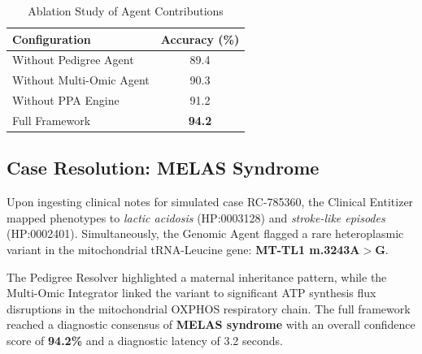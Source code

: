 \documentclass[conference]{IEEEtran}
\begin{document}
\begin{table}[!t]
\caption{Representative multi-omic variant prioritization illustrating ACMG classification, mitochondrial heteroplasmy, phenotype matching, and diagnostic prioritization.}
\label{tab_variant_priorities}
\centering
{}
\end{table}

\begin{table}[!t]
\caption{Ablation Study of Agent Contributions}
\label{tab_ablation}
\centering
\begin{tabular}{lc}
\hline
\textbf{Configuration} & \textbf{Accuracy (\%)}\\
\hline
Without Pedigree Agent & 89.4\\
Without Multi-Omic Agent & 90.3\\
Without PPA Engine & 91.2\\
Full Framework & \textbf{94.2}\\
\hline
\end{tabular}
\end{table}


\subsection{Case Resolution: MELAS Syndrome}
Upon ingesting clinical notes for simulated case RC-785360, the Clinical Entitizer mapped phenotypes to \textit{lactic acidosis} (HP:0003128) and \textit{stroke-like episodes} (HP:0002401). Simultaneously, the Genomic Agent flagged a rare heteroplasmic variant in the mitochondrial tRNA-Leucine gene: \textbf{MT-TL1 m.3243A$>$G}.

The Pedigree Resolver highlighted a maternal inheritance pattern, while the Multi-Omic Integrator linked the variant to significant ATP synthesis flux disruptions in the mitochondrial OXPHOS respiratory chain. The full framework reached a diagnostic consensus of \textbf{MELAS syndrome} with an overall confidence score of \textbf{94.2\%} and a diagnostic latency of 3.2 seconds.
\end{document}
